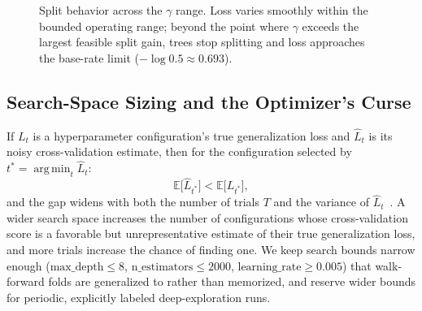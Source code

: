 \documentclass[conference]{IEEEtran}
\DeclareMathOperator*{\argmin}{arg\,min}
\begin{document}
\begin{figure}[!t]
\centering
{}
\caption{Split behavior across the $\gamma$ range. Loss varies smoothly
within the bounded operating range; beyond the point where $\gamma$
exceeds the largest feasible split gain, trees stop splitting and loss
approaches the base-rate limit ($-\log 0.5 \approx 0.693$).}
\label{fig:gamma}
\end{figure}

\subsection{Search-Space Sizing and the Optimizer's Curse}
\label{sec:search-math}

If $L_t$ is a hyperparameter configuration's true generalization loss
and $\hat{L}_t$ is its noisy cross-validation estimate, then for the
configuration selected by $t^* = \argmin_t \hat{L}_t$:
\begin{equation}
  \mathbb{E}\bigl[\hat{L}_{t^*}\bigr] < \mathbb{E}\bigl[L_{t^*}\bigr],
\label{eq:curse}
\end{equation}
and the gap widens with both the number of trials $T$ and the
variance of $\hat{L}_t$~\cite{smithwinkler2006}. A wider search space
increases the number of configurations whose cross-validation score
is a favorable but unrepresentative estimate of their true
generalization loss, and more trials increase the chance of finding
one. We keep search bounds narrow enough
($\text{max\_depth} \le 8$, $\text{n\_estimators} \le 2000$,
$\text{learning\_rate} \ge 0.005$) that walk-forward folds are
generalized to rather than memorized, and reserve wider bounds for
periodic, explicitly labeled deep-exploration runs.
\end{document}
